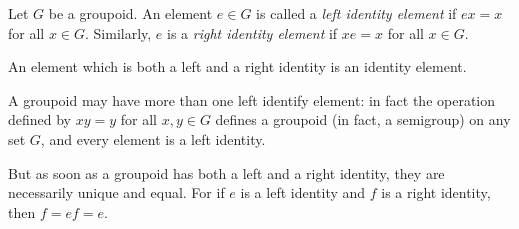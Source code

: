 \documentclass[12pt]{article}
\begin{document}
Let $G$ be a groupoid.  An element $e \in G$ is called a \emph{left identity element} if $ex = x$ for all $x \in G$.  Similarly, $e$ is a \emph{right identity element} if $xe = x$ for all $x \in G$.

An element which is both a left and a right identity is an identity element.

A groupoid may have more than one left identify element: in fact the operation 
defined by $x y = y$ for all $x, y \in G$ defines a groupoid (in fact, a semigroup) on any set $G$, and every element is a left identity.

But as soon as a groupoid has both a left and a right identity, they are necessarily unique and equal.  For if $e$ is a left identity and $f$ is a right identity, then $f = ef = e$.
\end{document}
